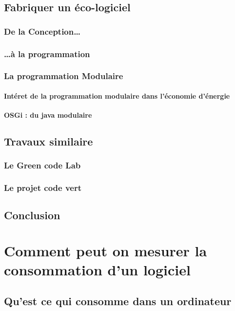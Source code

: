 \documentclass[a4paper, 11pt]{report}
\begin{document}
	\section{Fabriquer un éco-logiciel}
		\subsection{De la Conception\ldots}
		
		\subsection{\ldots à la programmation}
		
		\subsection{La programmation Modulaire}
			\subsubsection{Intéret de la programmation modulaire dans l'économie d'énergie}
			\subsubsection{OSGi : du java modulaire}
		
		
		
	\section{Travaux similaire}
		\subsection{Le Green code Lab}
		\subsection{Le projet code vert}
		
	\section{Conclusion}

\chapter{Comment peut on mesurer la consommation d'un logiciel}
	\section{Qu'est ce qui consomme dans un ordinateur}
\end{document}
